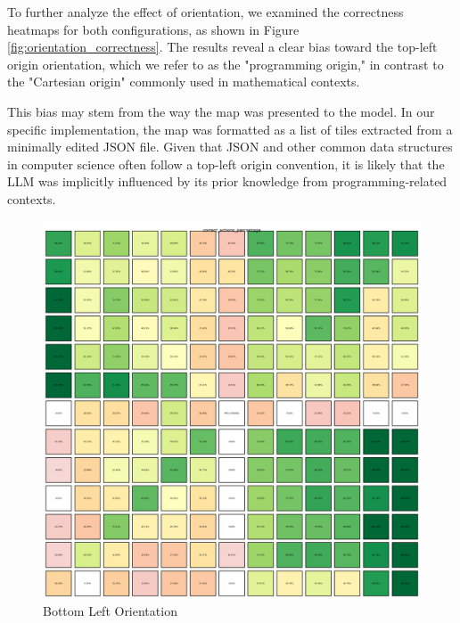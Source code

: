 To further analyze the effect of orientation, we examined the correctness heatmaps
for both configurations, as shown in Figure \ref{fig:orientation_correctness}. The
results reveal a clear bias toward the top-left origin orientation, which we
refer to as the "programming origin," in contrast to the "Cartesian origin" commonly
used in mathematical contexts.

This bias may stem from the way the map was presented to the model. In our
specific implementation, the map was formatted as a list of tiles extracted from
a minimally edited JSON file. Given that JSON and other common data structures
in computer science often follow a top-left origin convention, it is likely that
the LLM was implicitly influenced by its prior knowledge from programming-related
contexts.

\begin{figure}[h]
  \centering
  \begin{minipage}[b]{0.45\textwidth}
    \centering
    \includegraphics[width=\textwidth]{
      images/results_discussion/correctness_hm_BL.png
    }
    \caption{Bottom Left Orientation}
    \label{fig:heatmapBL}
  \end{minipage}
  \hfill
  \begin{minipage}[b]{0.45\textwidth}
    \centering

\end{minipage}
\end{figure}
